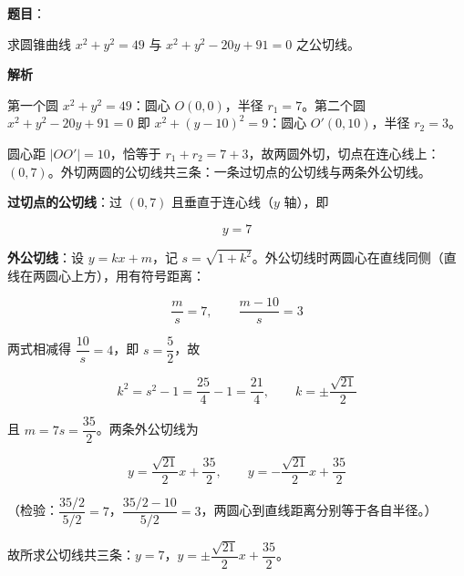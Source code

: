 \begin{answer}

\textbf{题目}：

求圆锥曲线 $x^2+y^2=49$ 与 $x^2+y^2-20y+91=0$ 之公切线。

\textbf{解析}

第一个圆 $x^2+y^2=49$：圆心 $O(0,0)$，半径 $r_1=7$。第二个圆 $x^2+y^2-20y+91=0$ 即 $x^2+(y-10)^2=9$：圆心 $O'(0,10)$，半径 $r_2=3$。

圆心距 $|OO'|=10$，恰等于 $r_1+r_2=7+3$，故两圆外切，切点在连心线上：$(0,7)$。外切两圆的公切线共三条：一条过切点的公切线与两条外公切线。

\textbf{过切点的公切线}：过 $(0,7)$ 且垂直于连心线（$y$ 轴），即

\nopagebreak[4]
\[
y=7
\]

\textbf{外公切线}：设 $y=kx+m$，记 $s=\sqrt{1+k^2}$。外公切线时两圆心在直线同侧（直线在两圆心上方），用有符号距离：

\nopagebreak[4]
\[
\frac{m}{s}=7,\qquad \frac{m-10}{s}=3
\]

两式相减得 $\dfrac{10}{s}=4$，即 $s=\dfrac52$，故

\nopagebreak[4]
\[
k^2=s^2-1=\frac{25}{4}-1=\frac{21}{4},\qquad k=\pm\frac{\sqrt{21}}2
\]

且 $m=7s=\dfrac{35}{2}$。两条外公切线为

\nopagebreak[4]
\[
y=\frac{\sqrt{21}}{2}x+\frac{35}{2},\qquad y=-\frac{\sqrt{21}}{2}x+\frac{35}{2}
\]

（检验：$\dfrac{35/2}{5/2}=7$，$\dfrac{35/2-10}{5/2}=3$，两圆心到直线距离分别等于各自半径。）

故所求公切线共三条：$y=7$，$y=\pm\dfrac{\sqrt{21}}2x+\dfrac{35}2$。


\end{answer}
